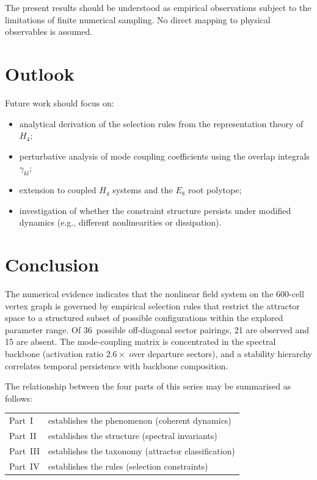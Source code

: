 \documentclass[12pt,a4paper]{article}
\newcommand{\Hfour}{H_4}
\newcommand{\Eeight}{E_8}
\begin{document}
The present results should be understood as empirical observations
subject to the limitations of finite numerical sampling.  No direct
mapping to physical observables is assumed.


\section{Outlook}\label{sec:outlook}

Future work should focus on:
\begin{itemize}[nosep]
\item analytical derivation of the selection rules from the
  representation theory of~$\Hfour$;
\item perturbative analysis of mode coupling coefficients using the
  overlap integrals $\gamma_{kl}$;
\item extension to coupled $\Hfour$ systems and the $\Eeight$ root
  polytope;
\item investigation of whether the constraint structure persists
  under modified dynamics (e.g., different nonlinearities or
  dissipation).
\end{itemize}


\section{Conclusion}\label{sec:conclusion}

The numerical evidence indicates that the nonlinear field system on
the 600-cell vertex graph is governed by empirical selection rules
that restrict the attractor space to a structured subset of possible
configurations within the explored parameter range.  Of
36~possible off-diagonal sector pairings, 21 are observed and 15 are
absent.  The mode-coupling matrix is concentrated in the spectral
backbone (activation ratio $2.6\times$ over departure sectors), and
a stability hierarchy correlates temporal persistence with backbone
composition.

The relationship between the four parts of this series may be
summarised as follows:
\begin{center}
\begin{tabular}{@{}ll@{}}
Part~I   & establishes the phenomenon (coherent dynamics) \\
Part~II  & establishes the structure (spectral invariants) \\
Part~III & establishes the taxonomy (attractor classification) \\
Part~IV  & establishes the rules (selection constraints) \\
\end{tabular}
\end{center}
\end{document}
